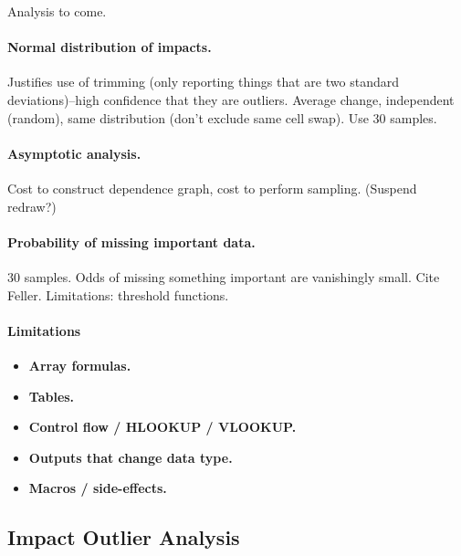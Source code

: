 
Analysis to come.

\paragraph{Normal distribution of impacts.}

Justifies use of trimming (only reporting things that are two standard
deviations)--high confidence that they are outliers.  Average change,
independent (random), same distribution (don't exclude same cell
swap). Use 30 samples.

\paragraph{Asymptotic analysis.}

Cost to construct dependence graph, cost to perform sampling. (Suspend redraw?)

\paragraph{Probability of missing important data.}

30 samples. Odds of missing something important are vanishingly small.
Cite Feller. Limitations: threshold functions.

\paragraph{Limitations}

\begin{itemize}
\item {\bf Array formulas.}
\item {\bf Tables.}
\item {\bf Control flow / HLOOKUP / VLOOKUP.}
\item {\bf Outputs that change data type.}
\item {\bf Macros / side-effects.}
\end{itemize}

\subsection{Impact Outlier Analysis}


